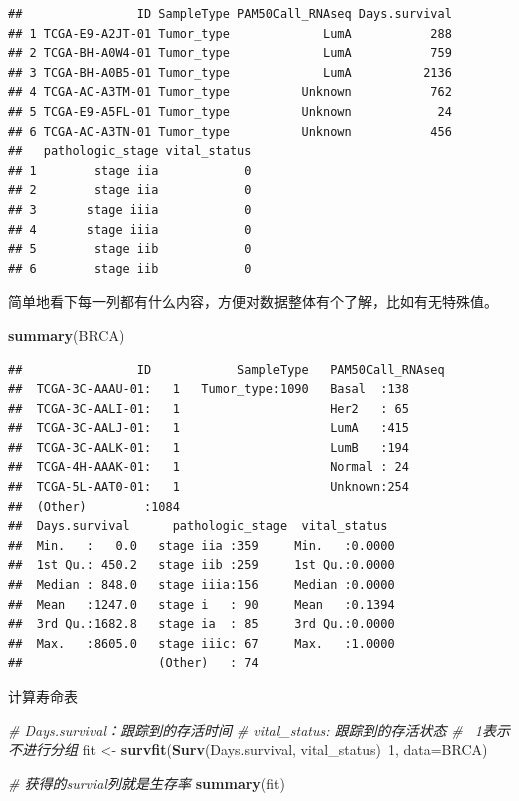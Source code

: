 \documentclass[]{article}
\newenvironment{Shaded}{\begin{snugshade}}{\end{snugshade}}
\newcommand{\KeywordTok}[1]{\textcolor[rgb]{0.13,0.29,0.53}{\textbf{{#1}}}}
\newcommand{\DataTypeTok}[1]{\textcolor[rgb]{0.13,0.29,0.53}{{#1}}}
\newcommand{\DecValTok}[1]{\textcolor[rgb]{0.00,0.00,0.81}{{#1}}}
\newcommand{\StringTok}[1]{\textcolor[rgb]{0.31,0.60,0.02}{{#1}}}
\newcommand{\CommentTok}[1]{\textcolor[rgb]{0.56,0.35,0.01}{\textit{{#1}}}}
\newcommand{\NormalTok}[1]{{#1}}
\numberwithin{figure}{section}
\numberwithin{table}{section}
\theoremstyle{definition}
\theoremstyle{definition}
\theoremstyle{definition}
\theoremstyle{remark}
\begin{document}
\begin{verbatim}
##                ID SampleType PAM50Call_RNAseq Days.survival
## 1 TCGA-E9-A2JT-01 Tumor_type             LumA           288
## 2 TCGA-BH-A0W4-01 Tumor_type             LumA           759
## 3 TCGA-BH-A0B5-01 Tumor_type             LumA          2136
## 4 TCGA-AC-A3TM-01 Tumor_type          Unknown           762
## 5 TCGA-E9-A5FL-01 Tumor_type          Unknown            24
## 6 TCGA-AC-A3TN-01 Tumor_type          Unknown           456
##   pathologic_stage vital_status
## 1        stage iia            0
## 2        stage iia            0
## 3       stage iiia            0
## 4       stage iiia            0
## 5        stage iib            0
## 6        stage iib            0
\end{verbatim}

简单地看下每一列都有什么内容，方便对数据整体有个了解，比如有无特殊值。

\begin{Shaded}
\begin{Highlighting}[]
\KeywordTok{summary}\NormalTok{(BRCA)}
\end{Highlighting}
\end{Shaded}

\begin{verbatim}
##                ID            SampleType   PAM50Call_RNAseq
##  TCGA-3C-AAAU-01:   1   Tumor_type:1090   Basal  :138     
##  TCGA-3C-AALI-01:   1                     Her2   : 65     
##  TCGA-3C-AALJ-01:   1                     LumA   :415     
##  TCGA-3C-AALK-01:   1                     LumB   :194     
##  TCGA-4H-AAAK-01:   1                     Normal : 24     
##  TCGA-5L-AAT0-01:   1                     Unknown:254     
##  (Other)        :1084                                     
##  Days.survival      pathologic_stage  vital_status   
##  Min.   :   0.0   stage iia :359     Min.   :0.0000  
##  1st Qu.: 450.2   stage iib :259     1st Qu.:0.0000  
##  Median : 848.0   stage iiia:156     Median :0.0000  
##  Mean   :1247.0   stage i   : 90     Mean   :0.1394  
##  3rd Qu.:1682.8   stage ia  : 85     3rd Qu.:0.0000  
##  Max.   :8605.0   stage iiic: 67     Max.   :1.0000  
##                   (Other)   : 74
\end{verbatim}

计算寿命表

\begin{Shaded}
\begin{Highlighting}[]
\CommentTok{# Days.survival：跟踪到的存活时间}
\CommentTok{# vital_status: 跟踪到的存活状态}
\CommentTok{# ~1表示不进行分组}
\NormalTok{fit <-}\StringTok{ }\KeywordTok{survfit}\NormalTok{(}\KeywordTok{Surv}\NormalTok{(Days.survival, vital_status)~}\DecValTok{1}\NormalTok{, }\DataTypeTok{data=}\NormalTok{BRCA)}

\CommentTok{# 获得的survial列就是生存率 }
\KeywordTok{summary}\NormalTok{(fit)}
\end{Highlighting}
\end{Shaded}
\end{document}
